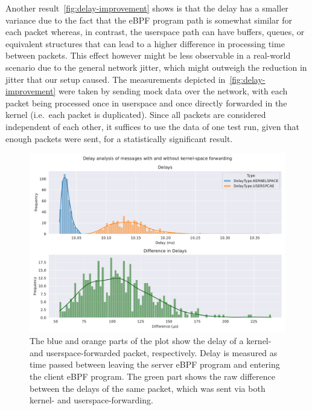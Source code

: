 Another result~\autoref{fig:delay-improvement} shows is that the delay has a smaller variance due to the fact 
that the eBPF program path is somewhat similar for each packet whereas, in contrast, the userspace path can have 
buffers, queues, or equivalent structures that can lead to a higher difference in processing time between packets. 
This effect however might be less observable in a real-world scenario due to the general network jitter, which 
might outweigh the reduction in jitter that our setup caused.
The measurements depicted in~\autoref{fig:delay-improvement} were taken by sending mock data over 
the network, with each packet being processed once in userspace and once directly forwarded in the kernel
(i.e.~each packet is duplicated).
Since all packets are considered independent of each other, it suffices to use the data of one test run, given 
that enough packets were sent, for a statistically significant result.

\vspace{0.5cm}
\begin{figure}[H]
    \centering
    \includegraphics[width=\textwidth]{figures/04_testing_and_results/delays_small_packets_simple_userspace.pdf}
    \caption[Delay analysis of eBPF approach]{The blue and orange parts of the plot show the delay of a 
    kernel- and userspace-forwarded packet, respectively. Delay is measured as time passed between
    leaving the server eBPF program and entering the client eBPF program.
    The green part shows the raw difference between the delays of the same packet, which was sent via both 
    kernel- and userspace-forwarding.}\label{fig:delay-improvement}
\end{figure}
\vspace{0.5cm}


